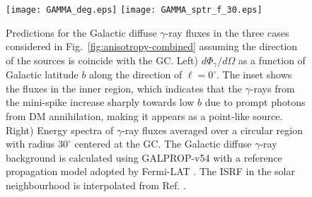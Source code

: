 \documentclass[aps,prl,twocolumn,a4paper]{revtex4}
\newcommand{\fig}[1]{Fig.~\ref{#1}}
\begin{document}
\begin{figure}[thb]
	\begin{center}
		\texttt{[image: GAMMA\_deg.eps]}
		\texttt{[image: GAMMA\_sptr\_f\_30.eps]}
		\caption{
			Predictions for the Galactic diffuse $\gamma$-ray fluxes in the three cases
			considered in \fig{fig:anisotropy-combined} assuming the direction of the sources
			is coincide with the GC. %
			Left) 
			$d\Phi_{\gamma}/d\Omega$ as a function of Galactic latitude $b$
			along the direction of  $\ell=0^{\circ}$.
			The inset shows the fluxes  in the  inner region,
			which indicates that the $\gamma$-rays from the mini-spike
			increase sharply towards low $b$ due to prompt photons from DM annihilation, 
			making it appears as a point-like source.
			Right)
			Energy spectra of $\gamma$-ray fluxes averaged over a circular region with radius $30^{\circ}$
			centered at the GC.
			The Galactic diffuse $\gamma$-ray background is 
			calculated using  GALPROP-v54 \cite{galprop}
			with a reference propagation model 
			adopted by Fermi-LAT
			\cite{
				Ackermann:2012pya%
			}.
			The ISRF in the solar neighbourhood is interpolated from Ref.
			\cite{
				Porter:2008ve%
			}.
		}
		\label{fig:GAMMA}
	\end{center}
\end{figure}
\end{document}
